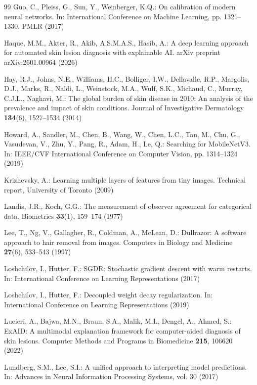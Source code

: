 \documentclass[runningheads]{llncs}
\begin{document}
\begin{thebibliography}{99}
Guo, C., Pleiss, G., Sun, Y., Weinberger, K.Q.: On calibration of modern neural networks. In: International Conference on Machine Learning, pp. 1321--1330. PMLR (2017)

Haque, M.M., Akter, R., Akib, A.S.M.A.S., Hasib, A.: A deep learning approach for automated skin lesion diagnosis with explainable AI. arXiv preprint arXiv:2601.00964 (2026)

Hay, R.J., Johns, N.E., Williams, H.C., Bolliger, I.W., Dellavalle, R.P., Margolis, D.J., Marks, R., Naldi, L., Weinstock, M.A., Wulf, S.K., Michaud, C., Murray, C.J.L., Naghavi, M.: The global burden of skin disease in 2010: An analysis of the prevalence and impact of skin conditions. Journal of Investigative Dermatology \textbf{134}(6), 1527--1534 (2014)

Howard, A., Sandler, M., Chen, B., Wang, W., Chen, L.C., Tan, M., Chu, G., Vasudevan, V., Zhu, Y., Pang, R., Adam, H., Le, Q.: Searching for MobileNetV3. In: IEEE/CVF International Conference on Computer Vision, pp. 1314--1324 (2019)

Krizhevsky, A.: Learning multiple layers of features from tiny images. Technical report, University of Toronto (2009)

Landis, J.R., Koch, G.G.: The measurement of observer agreement for categorical data. Biometrics \textbf{33}(1), 159--174 (1977)

Lee, T., Ng, V., Gallagher, R., Coldman, A., McLean, D.: Dullrazor: A software approach to hair removal from images. Computers in Biology and Medicine \textbf{27}(6), 533--543 (1997)

Loshchilov, I., Hutter, F.: SGDR: Stochastic gradient descent with warm restarts. In: International Conference on Learning Representations (2017)

Loshchilov, I., Hutter, F.: Decoupled weight decay regularization. In: International Conference on Learning Representations (2019)

Lucieri, A., Bajwa, M.N., Braun, S.A., Malik, M.I., Dengel, A., Ahmed, S.: ExAID: A multimodal explanation framework for computer-aided diagnosis of skin lesions. Computer Methods and Programs in Biomedicine \textbf{215}, 106620 (2022)

Lundberg, S.M., Lee, S.I.: A unified approach to interpreting model predictions. In: Advances in Neural Information Processing Systems, vol. 30 (2017)


\end{thebibliography}
\end{document}
